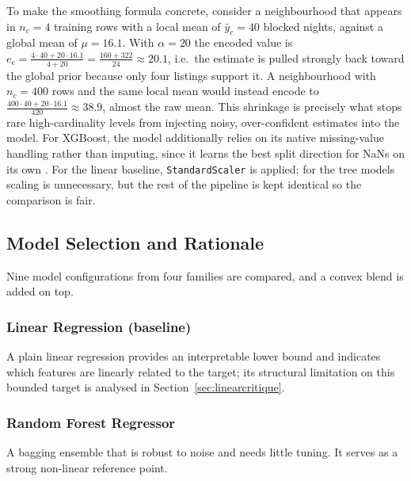 \documentclass[journal]{IEEEtran}
\begin{document}
To make the smoothing formula concrete, consider a neighbourhood that appears in
$n_c=4$ training rows with a local mean of $\bar y_c=40$ blocked nights, against a
global mean of $\mu=16.1$. With $\alpha=20$ the encoded value is
$e_c=\frac{4\cdot 40+20\cdot 16.1}{4+20}=\frac{160+322}{24}\approx 20.1$, i.e.\
the estimate is pulled strongly back toward the global prior because only four
listings support it. A neighbourhood with $n_c=400$ rows and the same local mean
would instead encode to $\frac{400\cdot40+20\cdot16.1}{420}\approx 38.9$, almost
the raw mean. This shrinkage is precisely what stops rare high-cardinality levels
from injecting noisy, over-confident estimates into the model. For XGBoost, the model additionally relies on its
native missing-value handling rather than imputing, since it learns the best
split direction for NaNs on its own \cite{chen2016xgboost}. For the linear
baseline, \texttt{StandardScaler} is applied; for the tree models scaling is
unnecessary, but the rest of the pipeline is kept identical so the comparison is
fair.

\subsection{Model Selection and Rationale}
Nine model configurations from four families are compared, and a convex blend
is added on top.

\subsubsection{Linear Regression (baseline)}
A plain linear regression provides an interpretable lower bound and indicates which
features are linearly related to the target; its structural limitation on this
bounded target is analysed in Section~\ref{sec:linearcritique}.

\subsubsection{Random Forest Regressor}
A bagging ensemble \cite{breiman1996,breiman2001} that is robust to noise and
needs little tuning. It serves as a strong non-linear reference point.
\end{document}
